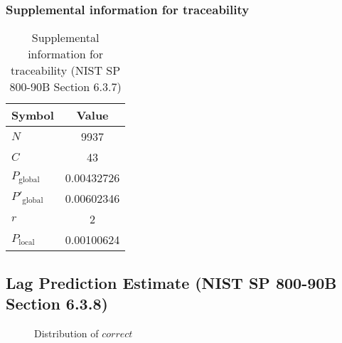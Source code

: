 \documentclass[a3paper,xelatex,english]{bxjsarticle}
\begin{document}
\subsubsection{Supplemental information for traceability}
\renewcommand{\arraystretch}{1.8}
\begin{table}[h]
\caption{Supplemental information for traceability (NIST SP 800-90B Section 6.3.7)}
\begin{center}
\begin{tabular}{|l|c|}
\hline 
\rowcolor{anotherlightblue} %
Symbol				& Value \\ \hline 
$N$				& 9937\\ \hline 
$C$				& 43\\ \hline 
$P_{\textrm{global}}$				& 0.00432726\\ \hline 
$P'_{\textrm{global}}$			& 0.00602346\\ \hline 
$r$				& 2\\ \hline 
$P_{\textrm{local}}$ 			& 0.00100624\\ \hline
\end{tabular}
\end{center}
\end{table}
\renewcommand{\arraystretch}{1.4}
\clearpage
\subsection{Lag Prediction Estimate (NIST SP 800-90B Section 6.3.8)}
\begin{figure}[htbp]
\centering

\caption{Distribution of $correct$}
\end{figure}
\end{document}
